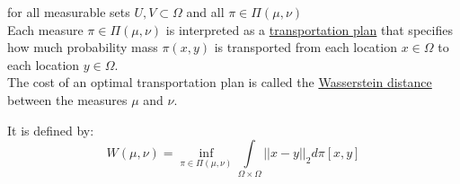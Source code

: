 \documentclass[11pt]{article}
\begin{document}
for all measurable sets $U,V \subset \Omega$ and all $\pi \in \Pi(\mu,\nu)$ \\

Each measure $\pi \in \Pi(\mu,\nu)$ is interpreted as a \underline{transportation plan} that specifies how much probability mass $\pi(x,y)$ is transported from each location $x \in \Omega$ to each location $y \in \Omega$. \\

The cost of an optimal transportation plan is called the \underline{Wasserstein distance} between the measures $\mu$ and $\nu$.

It is defined by: $$W(\mu,\nu) = \inf\limits_{\pi\in\Pi(\mu,\nu)}\int\limits_{\Omega	\times \Omega} ||x-y||_{2} d\pi[x,y]$$
\end{document}
